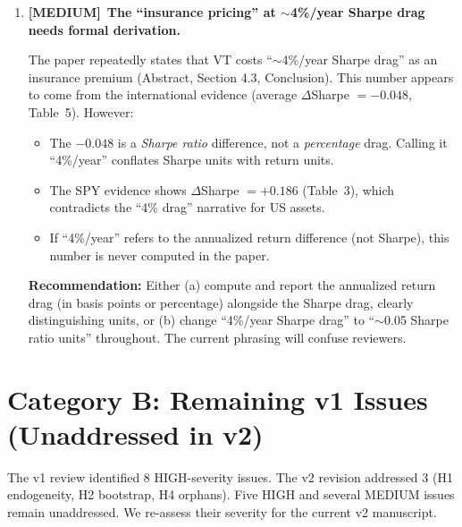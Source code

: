 \documentclass[12pt,a4paper]{article}
\newcommand{\MEDIUM}{\textcolor{medsev}{\textbf{[MEDIUM]}}}
\begin{document}
\begin{enumerate}[label=\textbf{A.\arabic*}]
\textbf{Recommendation:} Add ``asset-specific'' or ``single-asset'' before ``trend following'' in the abstract and conclusion. The title can remain as-is (it is a provocative question, not a claim), but the first paragraph of the abstract should clarify: ``\ldots we decompose VT's benefits relative to asset-specific time-series momentum (TSMOM), as distinct from diversified managed-futures trend following.''


\item \MEDIUM\ \textbf{The ``insurance pricing'' at $\sim$4\%/year Sharpe drag needs formal derivation.}

The paper repeatedly states that VT costs ``$\sim$4\%/year Sharpe drag'' as an insurance premium (Abstract, Section 4.3, Conclusion). This number appears to come from the international evidence (average $\Delta$Sharpe $= -0.048$, Table~5). However:

\begin{itemize}
\item The $-0.048$ is a \textit{Sharpe ratio} difference, not a \textit{percentage} drag. Calling it ``4\%/year'' conflates Sharpe units with return units.
\item The SPY evidence shows $\Delta$Sharpe $= +0.186$ (Table~3), which contradicts the ``4\% drag'' narrative for US assets.
\item If ``4\%/year'' refers to the annualized return difference (not Sharpe), this number is never computed in the paper.
\end{itemize}

\textbf{Recommendation:} Either (a) compute and report the annualized return drag (in basis points or percentage) alongside the Sharpe drag, clearly distinguishing units, or (b) change ``4\%/year Sharpe drag'' to ``$\sim$0.05 Sharpe ratio units'' throughout. The current phrasing will confuse reviewers.

\end{enumerate}


\section{Category B: Remaining v1 Issues (Unaddressed in v2)}

The v1 review identified 8 HIGH-severity issues. The v2 revision addressed 3 (H1 endogeneity, H2 bootstrap, H4 orphans). Five HIGH and several MEDIUM issues remain unaddressed. We re-assess their severity for the current v2 manuscript.
\end{document}
